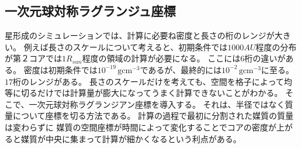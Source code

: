 \documentclass[a4j, dvipdfmx]{jsarticle}
\begin{document}
\subsection{一次元球対称ラグランジュ座標}
星形成のシミュレーションでは、計算に必要ね密度と長さの桁のレンジが大きい。
例えば長さのスケールについて考えると、初期条件では$1000AU$程度の分布が第２コアでは$1R_{sun}$程度の領域の計算が必要になる。
ここには$6$桁の違いがある。
密度は初期条件では$10^{-19}\,\mathrm{gcm^{-3}}$であるが、最終的には$10^{-2}\,\mathrm{gcm^{-3}}$に至る。$17$桁のレンジがある。
長さのスケールだけを考えても、空間を格子によって均等に切るだけでは計算量が膨大になってうまく計算できないことがわかる。
そこで、一次元球対称ラグランジアン座標を導入する。
それは、半径ではなく質量について座標を切る方法である。
計算の過程で最初に分割された媒質の質量は変わらずに
媒質の空間座標が時間によって変化することでコアの密度が上がると媒質が中央に集まって計算が細かくなるという利点がある。
\end{document}
